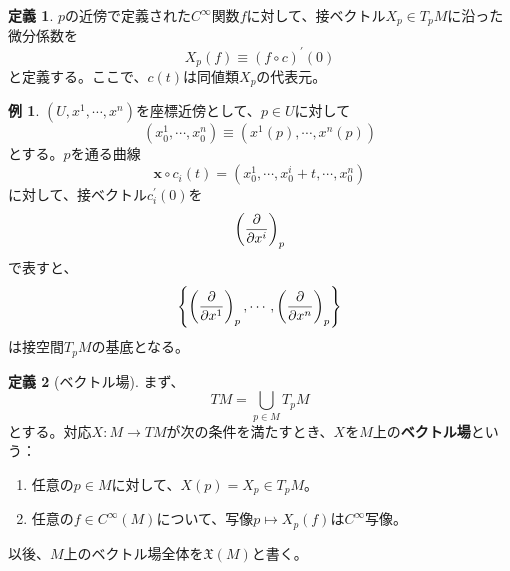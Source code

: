 \documentclass[unicode,a4paper,11pt]{ltjsarticle}
\theoremstyle{definition}
\newtheorem{dfn}{定義}[section]
\newtheorem{exm}{例}[section]
\begin{document}
\begin{dfn}
  $p$の近傍で定義された$C^{\infty}$関数$f$に対して、接ベクトル$X_{p}\in T_{p}M$に沿った微分係数を
  \begin{equation}
    X_{p}(f)
    \equiv
    (f\circ c)^{\prime}(0)
  \end{equation}
  と定義する。ここで、$c(t)$は同値類$X_{p}$の代表元。
\end{dfn}

\begin{exm}
  $(U,x^{1},\cdots,x^{n})$を座標近傍として、$p\in U$に対して
  \begin{equation}
    (x_{0}^{1},\cdots,x_{0}^{n})
    \equiv
    (x^{1}(p),\cdots,x^{n}(p))
  \end{equation}
  とする。$p$を通る曲線
  \begin{equation}
    \bm{x}\circ c_{i}(t)=(x_{0}^{1},\cdots,x_{0}^{i}+t,\cdots,x_{0}^{n})
  \end{equation}
  に対して、接ベクトル$c_{i}^{\prime}(0)$を
  \begin{equation}
    \left( \pdv{}{x^{i}} \right)_{p}
  \end{equation}
  で表すと、
  \begin{equation}
    \left\{
    \left( \pdv{}{x^{1}} \right)_{p}
    ,\cdots,
    \left( \pdv{}{x^{n}} \right)_{p}
    \right\}
  \end{equation}
  は接空間$T_{p}M$の基底となる。
\end{exm}

\begin{dfn}[ベクトル場]
  まず、
  \begin{equation}
    TM=\bigcup_{p\in M}T_{p}M
  \end{equation}
  とする。対応$X:M\rightarrow TM$が次の条件を満たすとき、$X$を$M$上の\textbf{ベクトル場}という：
  \begin{enumerate}
    \item
          任意の$p\in M$に対して、$X(p)=X_{p}\in T_{p}M$。
    \item
          任意の$f\in C^{\infty}(M)$について、写像$p\mapsto X_{p}(f)$は$C^{\infty}$写像。
  \end{enumerate}
  以後、$M$上のベクトル場全体を$\mathfrak{X}(M)$と書く。
\end{dfn}
\end{document}
